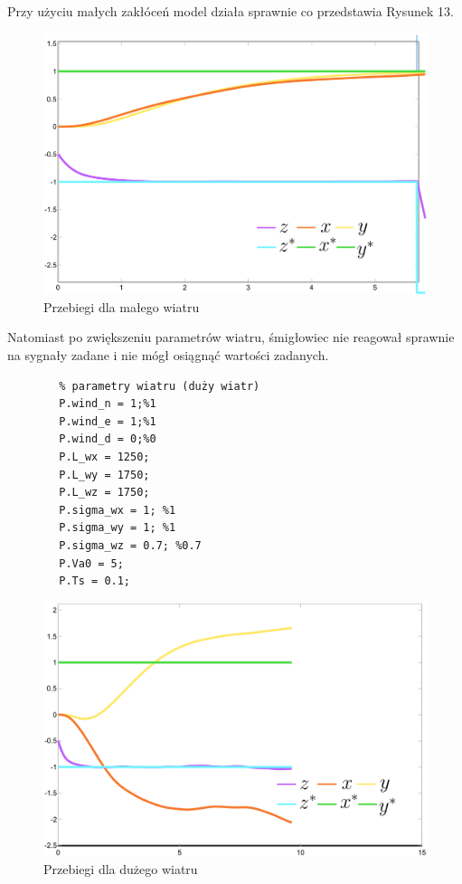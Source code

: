 \documentclass[polish,11pt,a4paper]{article}
\begin{document}
Przy użyciu małych zakłóceń model działa sprawnie co przedstawia Rysunek 13. 

\begin{figure}[H]
	\centering
	\includegraphics[width=1\linewidth]{wiatr/maly}
	\caption{Przebiegi dla małego wiatru}
	\label{fig:maly}
\end{figure}

Natomiast po zwiększeniu parametrów wiatru, śmigłowiec nie reagował sprawnie na sygnały zadane i nie mógł osiągnąć wartości zadanych.

\begin{footnotesize}
	\begin{verbatim}
		% parametry wiatru (duży wiatr)
		P.wind_n = 1;%1
		P.wind_e = 1;%1
		P.wind_d = 0;%0
		P.L_wx = 1250;
		P.L_wy = 1750;
		P.L_wz = 1750;
		P.sigma_wx = 1; %1
		P.sigma_wy = 1; %1
		P.sigma_wz = 0.7; %0.7
		P.Va0 = 5;
		P.Ts = 0.1;
	\end{verbatim}
\end{footnotesize}

\begin{figure}[H]
	\centering
	\includegraphics[width=1\linewidth]{wiatr/duzy}
	\caption{Przebiegi dla dużego wiatru}
	\label{fig:duzy}
\end{figure}
\end{document}
